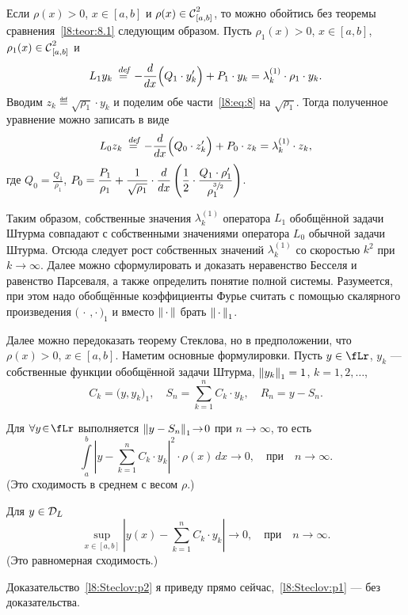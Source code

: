 Если $\rho(x)>0$, $x\in[a,b]$ и $\rho(x)\in\Cfn[{[a,b]}]{2}$, то можно обойтись без теоремы сравнения~\ref{l8:teor:8.1} следующим образом. Пусть $\rho_1(x)>0$, $x\in[a,b]$, $\rho_1(x)\in\Cfn[{[a,b]}]{2}$ и 
\begin{equation}\label{l8:eq:8}
	 L_1y_k\eqdef-\der{}{x}\Big(Q_1\cdot y'_k\Big)+P_1\cdot y_k=\lambda_k^{(1)}\cdot\rho_1\cdot y_k.
\end{equation}
Вводим {} $z_k\eqdef\sqrt{\rho_1}\cdot y_k$ и поделим обе части~\eqref{l8:eq:8} на $\sqrt{\rho_1}$. Тогда полученное уравнение можно записать в виде
\begin{equation}\label{l8:eq:9}
	 L_0z_k\eqdef-\der{}{x}\Big(Q_0\cdot z'_k\Big)+P_0\cdot z_k=\lambda_k^{(1)}\cdot z_k,
\end{equation}
где $\displaystyle Q_0=\frac{Q_1}{\rho_1}$, $\displaystyle P_0=\frac{P_1}{\rho_1}+\frac1{\sqrt{\rho_1}}\cdot\der{}{x}\left(\frac12\cdot\frac{Q_1\cdot\rho'_1}{\rho_1^{\sfrac{3}{2}}}\right)$.

Таким образом, собственные значения $\lambda_k^{(1)}$ оператора $L_1$ обобщённой задачи Штурма совпадают с собственными значениями оператора $L_0$ обычной задачи Штурма. Отсюда следует рост собственных значений $\lambda_k^{(1)}$ со скоростью $k^2$ при $k\to\infty$. Далее можно сформулировать и доказать неравенство Бесселя и равенство Парсеваля, а также определить понятие полной системы. Разумеется{\mb,} при этом надо обобщённые коэффициенты Фурье считать с помощью скалярного произведения $\big(\,\cdot\,,\cdot\,\big)_1$ и вместо $\norm{\,\cdot\,}$ брать $\norm{\,\cdot\,}_1$.

Далее можно передоказать теорему Стеклова, но в предположении, что $\rho(x)>0$, $x\in[a,b]$. Наметим основные формулировки. Пусть $y\in\fLr$, $y_k$ --- собственные функции обобщённой задачи Штурма, $\norm{y_k}_1=1$, $k=1,2,\ldots$,
\begin{equation*}
	 C_k=\big(y,y_k\big)_1,\quad S_n=\sum\limits_{k=1}^n C_k\cdot y_k,\quad R_n=y-S_n.
\end{equation*}
\begin{Teor}\label{l8:teor:Steclov}\hfill
	\begin{enumerateP1}
		\item\label{l8:Steclov:p1} Для $\forall y\!\in\!\fLr$ выполняется $\norm{y-S_n}_1\!\to\!0$ при $n\!\to\!\infty$, то есть
		\begin{equation*}
			\int\limits_a^b\left|y-\sum\limits_{k=1}^n C_k\cdot y_k\right|^2\cdot\rho(x)\,dx\to0,\quad\text{при}\quad n\to\infty.
		\end{equation*}
		(Это сходимость в среднем с весом $\rho$.)
		
		\item\label{l8:Steclov:p2} Для $y\in\mc{D}_L$
		\begin{equation*}
			\sup\limits_{x\in[a,b]}\left|y(x)-\sum\limits_{k=1}^{n}C_k\cdot y_k\right|\to0,\quad\text{при}\quad n\to\infty.
		\end{equation*}
		(Это равномерная сходимость.)
	\end{enumerateP1}
\end{Teor}
\noindent Доказательство~\ref{l8:Steclov:p2} я приведу прямо сейчас,~\ref{l8:Steclov:p1} --- без доказательства.

